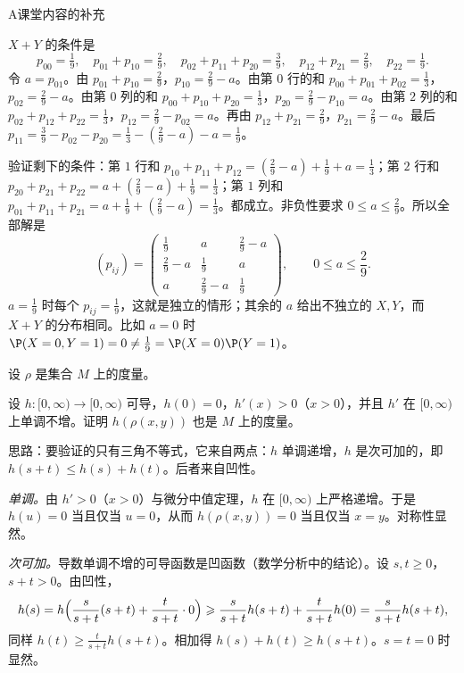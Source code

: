 \begin{exercises}{A}{课堂内容的补充}
\begin{questions}
\begin{solution}
$X+Y$ 的条件是
\[
p_{00}=\tfrac19,\quad p_{01}+p_{10}=\tfrac29,\quad p_{02}+p_{11}+p_{20}=\tfrac39,\quad p_{12}+p_{21}=\tfrac29,\quad p_{22}=\tfrac19 .
\]
令 $a=p_{01}$。由 $p_{01}+p_{10}=\frac29$，$p_{10}=\frac29-a$。由第 $0$ 行的和 $p_{00}+p_{01}+p_{02}=\frac13$，$p_{02}=\frac29-a$。由第 $0$ 列的和 $p_{00}+p_{10}+p_{20}=\frac13$，$p_{20}=\frac29-p_{10}=a$。由第 $2$ 列的和 $p_{02}+p_{12}+p_{22}=\frac13$，$p_{12}=\frac29-p_{02}=a$。再由 $p_{12}+p_{21}=\frac29$，$p_{21}=\frac29-a$。最后 $p_{11}=\frac39-p_{02}-p_{20}=\frac13-(\frac29-a)-a=\frac19$。

验证剩下的条件：第 $1$ 行和 $p_{10}+p_{11}+p_{12}=(\frac29-a)+\frac19+a=\frac13$；第 $2$ 行和 $p_{20}+p_{21}+p_{22}=a+(\frac29-a)+\frac19=\frac13$；第 $1$ 列和 $p_{01}+p_{11}+p_{21}=a+\frac19+(\frac29-a)=\frac13$。都成立。非负性要求 $0\leqslant a\leqslant\frac29$。所以全部解是
\[
(p_{ij})=\begin{pmatrix}\frac19&a&\frac29-a\\[2pt]\frac29-a&\frac19&a\\[2pt]a&\frac29-a&\frac19\end{pmatrix},\qquad0\leqslant a\leqslant\frac29 .
\]
$a=\frac19$ 时每个 $p_{ij}=\frac19$，这就是独立的情形；其余的 $a$ 给出不独立的 $X,Y$，而 $X+Y$ 的分布相同。比如 $a=0$ 时 $\P(X=0,Y=1)=0\neq\frac19=\P(X=0)\P(Y=1)$。
\end{solution}
\end{questions}

\item\label{ex:independence:A13} 设 $\rho$ 是集合 $M$ 上的度量。
\begin{questions}
\item 设 $h:[0,\infty)\to[0,\infty)$ 可导，$h(0)=0$，$h'(x)>0$（$x>0$），并且 $h'$ 在 $[0,\infty)$ 上单调不增。证明 $h(\rho(x,y))$ 也是 $M$ 上的度量。
\begin{solution}
思路：要验证的只有三角不等式，它来自两点：$h$ 单调递增，$h$ 是次可加的，即 $h(s+t)\leqslant h(s)+h(t)$。后者来自凹性。

\emph{单调。}由 $h'>0$（$x>0$）与微分中值定理，$h$ 在 $[0,\infty)$ 上严格递增。于是 $h(u)=0$ 当且仅当 $u=0$，从而 $h(\rho(x,y))=0$ 当且仅当 $x=y$。对称性显然。

\emph{次可加。}导数单调不增的可导函数是凹函数（数学分析中的结论）。设 $s,t\geqslant0$，$s+t>0$。由凹性，
\[
h(s)=h\Bigl(\frac s{s+t}(s+t)+\frac t{s+t}\cdot0\Bigr)\geqslant\frac s{s+t}h(s+t)+\frac t{s+t}h(0)=\frac s{s+t}h(s+t),
\]
同样 $h(t)\geqslant\frac t{s+t}h(s+t)$。相加得 $h(s)+h(t)\geqslant h(s+t)$。$s=t=0$ 时显然。


\end{solution}
\end{questions}
\end{exercises}
